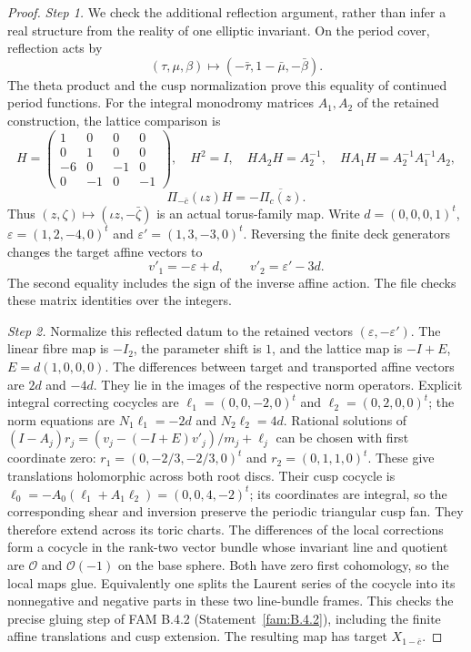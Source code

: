 \begin{proof}
\par\noindent\textit{Step 1.} We check the additional reflection argument, rather than infer a real
structure from the reality of one elliptic invariant. On the period
cover, reflection acts by
\[
 (\tau,\mu,\beta)\longmapsto(-\bar\tau,1-\bar\mu,-\bar\beta).
\]
The theta product and the cusp normalization prove this equality of
continued period functions. For the integral monodromy matrices
$A_1,A_2$ of the retained construction, the lattice comparison is
\[
 H=\begin{pmatrix}1&0&0&0\\0&1&0&0\\-6&0&-1&0\\0&-1&0&-1\end{pmatrix},
 \quad H^2=I,\quad HA_2H=A_2^{-1},\quad
 HA_1H=A_2^{-1}A_1^{-1}A_2,
\]
\[
 \Pi_{-\bar c}(\iota z)H=-\overline{\Pi_c(z)}.
\]
Thus $(z,\zeta)\mapsto(\iota z,-\bar\zeta)$ is an actual torus-family
map. Write $d=(0,0,0,1)^t$, $\varepsilon=(1,2,-4,0)^t$ and
$\varepsilon'=(1,3,-3,0)^t$. Reversing the finite deck generators
changes the target affine vectors to
\[
 v'_1=-\varepsilon+d,\qquad v'_2=\varepsilon'-3d.
\]
The second equality includes the sign of the inverse affine action.
The file  checks these matrix identities
over the integers.

\par\noindent\textit{Step 2.} Normalize this reflected datum to the retained vectors
$(\varepsilon,-\varepsilon')$. The linear fibre map is $-I_2$, the
parameter shift is $1$, and the lattice map is $-I+E$,
$E=d(1,0,0,0)$. The differences between target and transported affine
vectors are $2d$ and $-4d$. They lie in the images of the respective
norm operators. Explicit integral correcting cocycles are
$\ell_1=(0,0,-2,0)^t$ and $\ell_2=(0,2,0,0)^t$; the norm equations
are $N_1\ell_1=-2d$ and $N_2\ell_2=4d$. Rational solutions of
$(I-A_j)r_j=(v_j-(-I+E)v'_j)/m_j+\ell_j$ can be chosen with first
coordinate zero: $r_1=(0,-2/3,-2/3,0)^t$ and
$r_2=(0,1,1,0)^t$. These give translations holomorphic across both
root discs. Their cusp cocycle is
$\ell_0=-A_0(\ell_1+A_1\ell_2)=(0,0,4,-2)^t$; its coordinates are
integral, so the corresponding shear and inversion preserve the
periodic triangular cusp fan. They therefore extend across its toric
charts. The differences of the local corrections form a cocycle in
the rank-two vector bundle whose invariant line and quotient are
$\mathcal O$ and $\mathcal O(-1)$ on the base sphere. Both have zero
first cohomology, so the local maps glue. Equivalently one splits the
Laurent series of the cocycle into its nonnegative and negative
parts in these two line-bundle frames. This checks the precise
gluing step of FAM B.4.2 (Statement~\ref{fam:B.4.2}), including the finite affine translations
and cusp extension. The resulting map has target $X_{1-\bar c}$.


\end{proof}
